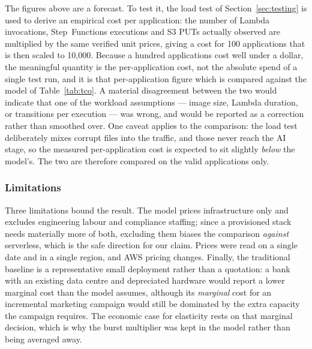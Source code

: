 The figures above are a forecast. To test it, the load test of
Section~\ref{sec:testing} is used to derive an empirical cost per application: the
number of Lambda invocations, Step~Functions executions and S3 PUTs actually
observed are multiplied by the same verified unit prices, giving a cost for 100
applications that is then scaled to 10{,}000. Because a hundred applications cost
well under a dollar, the meaningful quantity is the per-application cost, not the
absolute spend of a single test run, and it is that per-application figure which
is compared against the model of Table~\ref{tab:tco}. A material disagreement
between the two would indicate that one of the workload assumptions --- image
size, Lambda duration, or transitions per execution --- was wrong, and would be
reported as a correction rather than smoothed over. One caveat applies to the
comparison: the load test deliberately mixes corrupt files into the traffic, and
those never reach the AI stage, so the measured per-application cost is expected
to sit slightly \emph{below} the model's. The two are therefore compared on the
valid applications only.

\subsubsection{Limitations}\label{sec:cost:limitations}

Three limitations bound the result. The model prices infrastructure only and
excludes engineering labour and compliance staffing; since a provisioned stack
needs materially more of both, excluding them biases the comparison \emph{against}
serverless, which is the safe direction for our claim. Prices were read on a
single date and in a single region, and AWS pricing changes. Finally, the
traditional baseline is a representative small deployment rather than a
quotation: a bank with an existing data centre and depreciated hardware would
report a lower marginal cost than the model assumes, although its \emph{marginal}
cost for an incremental marketing campaign would still be dominated by the extra
capacity the campaign requires. The economic case for elasticity rests on that
marginal decision, which is why the burst multiplier was kept in the model rather
than being averaged away.
